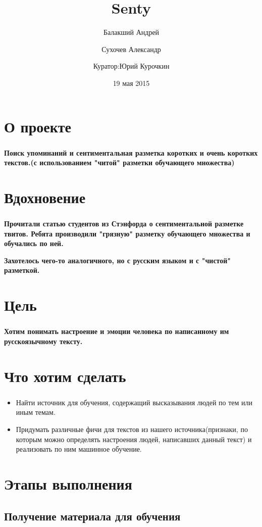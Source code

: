 \documentclass[t]{beamer}
\title{Senty}
\author{Балакший Андрей \and Сухочев Александр 
	\and \newline Куратор:Юрий Курочкин}
\date{19 мая 2015}
\institute[Computer Science Center]
\begin{document}
	\frame[plain]{\titlepage}
	
	
	\section{О проекте}
	\begin{frame}
		\frametitle{\insertsection}
		\textbf{Поиск упоминаний и сентиментальная разметка коротких и 	очень коротких текстов.(с использованием "читой" разметки обучающего множества)}
	\end{frame}
	
	
	\section{Вдохновение}
	\begin{frame}
		\frametitle{\insertsection}
		\textbf{Прочитали статью студентов из Стэнфорда о сентиментальной разметке твитов. Ребята производили "грязную" разметку обучающего множества и обучались по ней.}\pause
		
		\textbf{Захотелось чего-то аналогичного, но с русским языком и с "чистой" разметкой.}
	\end{frame}
	
	
	\section{Цель}
	\begin{frame}
		\frametitle{\insertsection}
		\textbf{Хотим понимать настроение и эмоции человека по написанному им русскоязычному тексту.}
	\end{frame}
	
	
	\section{Что хотим сделать}
	\begin{frame}
		\frametitle{\insertsection}
		\begin{itemize}
			\item Найти источник для обучения, содержащий высказывания людей по тем или иным темам.	
			\item Придумать различные фичи для текстов из нашего источника(признаки, по которым можно определять настроения людей, написавших данный текст) и реализовать по ним машинное обучение.
		\end{itemize}
	\end{frame}
	
	
	\section{Этапы выполнения}
	\subsection{Получение материала для обучения}
	
	
	
	
	
	
\end{document}
